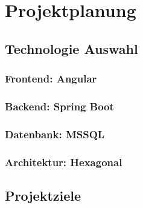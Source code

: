 \chapter{Projektplanung}\label{ch:data}
\section{Technologie Auswahl}
\subsection{Frontend: Angular}
\subsection{Backend: Spring Boot}
\subsection{Datenbank: MSSQL}
\subsection{Architektur: Hexagonal}
\section{Projektziele}
\Blindtext
